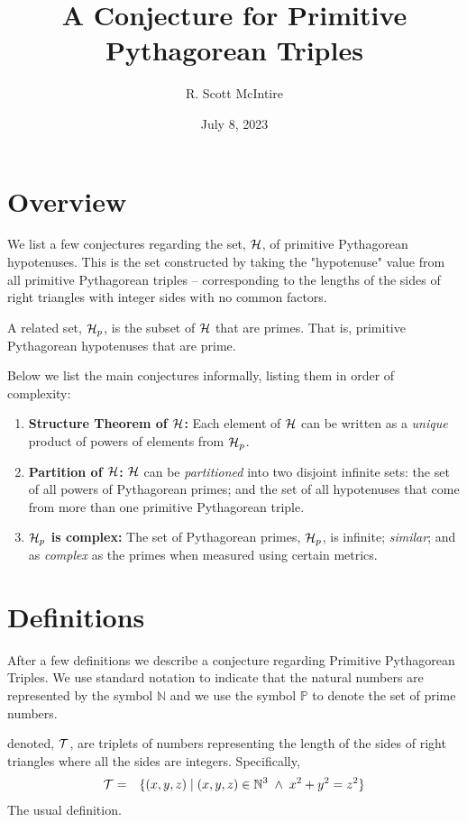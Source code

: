 \documentclass{article}
\title{A Conjecture for Primitive Pythagorean Triples}
\author{R. Scott McIntire}
\date{July 8, 2023}
\theoremstyle{definition}
\begin{document}
\maketitle


\section{Overview}
We list a few conjectures regarding the set, ${\cal H}$, of primitive Pythagorean hypotenuses. 
This is the set constructed by taking the "hypotenuse" value from all primitive Pythagorean triples -- corresponding to the lengths of the sides of 
right triangles with integer sides with no common factors.

A related set, ${\cal H}_p$, is the subset of ${\cal H}$ that are primes. That is, primitive Pythagorean hypotenuses that are prime.

Below we list the main conjectures informally, listing them in order of complexity:
\begin{enumerate}
  \item{{\bf Structure Theorem of ${\cal H}$:\/} Each element of ${\cal H}$ can be written as a {\em unique\/} product of powers of elements from ${\cal H}_p$.}
  \item{{\bf Partition of ${\cal H}$:\/} ${\cal H}$ can be {\em partitioned\/} into two disjoint infinite sets: 
    the set of all powers of Pythagorean primes; and the set of all hypotenuses that come from more than one primitive Pythagorean triple.}
  \item{{\bf ${\cal H}_p$ is complex:\/} The set of Pythagorean primes, ${\cal H}_p$, is infinite; {\em similar\/}; and as {\em complex\/} as the primes when measured using certain metrics.}
\end{enumerate}


\section{Definitions}
After a few definitions we describe a conjecture regarding Primitive Pythagorean Triples.
We use standard notation to indicate that the natural numbers are represented by the symbol $\mathbb{N}$ and 
we use the symbol $\mathbb{P}$ to denote the set of prime numbers.


 denoted, ${\cal T}$, are  triplets of numbers representing the length of the sides of
right triangles where all the sides are integers. Specifically,
\begin{eqnarray}
  {\cal T} & = & \{ (x,y,z) \; | \; (x,y,z) \in \mathbb{N}^3 \; \wedge \; x^2 + y^2 = z^2 \}
\end{eqnarray}
The usual definition.
\end{document}
